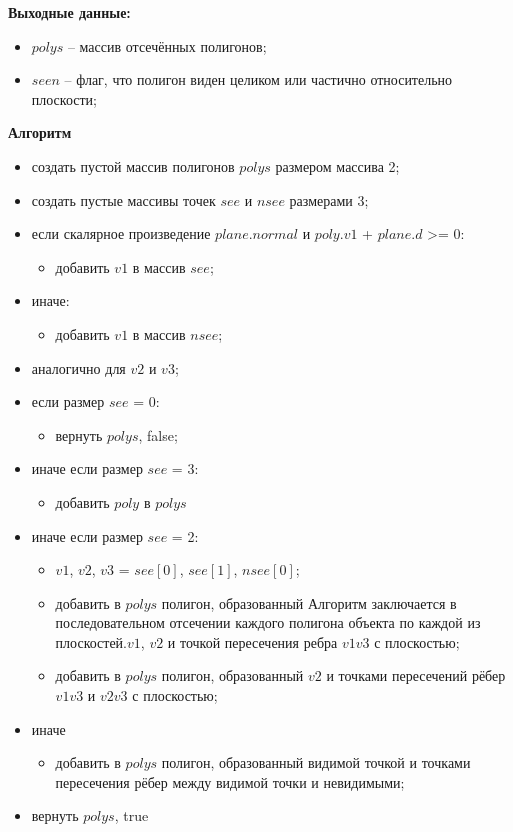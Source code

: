 \textbf{Выходные данные:}
\begin{itemize}
	\item $polys$ -- массив отсечённых полигонов;
	\item $seen$ -- флаг, что полигон виден целиком или частично относительно плоскости;
\end{itemize}

\textbf{Алгоритм}



\begin{itemize}
	\item создать пустой массив полигонов $polys$ размером массива 2;
	\item создать пустые массивы точек $see$ и $nsee$ размерами 3;
	\item если скалярное произведение $plane.normal$ и $poly.v1$ + $plane.d$ >= 0:
	\begin{itemize}
		\item добавить $v1$ в массив $see$;
	\end{itemize}
	\item иначе:
	\begin{itemize}
		\item добавить $v1$ в массив $nsee$;
	\end{itemize}
	\item аналогично для $v2$ и $v3$;
	
	\item если размер $see$ = 0:
	\begin{itemize}
		\item вернуть $polys$, false;
	\end{itemize}
	\item иначе если размер $see$ = 3:
	\begin{itemize}
		\item добавить $poly$ в $polys$
	\end{itemize}
	\item иначе если размер $see$ = 2:
	\begin{itemize}
		\item $v1$, $v2$, $v3$ = $see[0]$, $see[1]$, $nsee[0]$;
		\item добавить в $polys$ полигон, образованный Алгоритм заключается в последовательном отсечении каждого полигона объекта по каждой из плоскостей.$v1$, $v2$ и точкой пересечения ребра $v1v3$ с плоскостью;
		\item добавить в $polys$ полигон, образованный $v2$ и точками пересечений рёбер $v1v3$ и $v2v3$ с плоскостью;
	\end{itemize}
	\item иначе
	\begin{itemize}
		\item добавить в $polys$ полигон, образованный видимой точкой и точками пересечения рёбер между видимой точки и невидимыми;
	\end{itemize}
	\item вернуть $polys$, true
\end{itemize}


